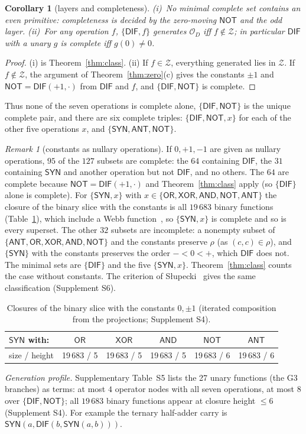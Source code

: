 \documentclass[conference]{IEEEtran}
\newcommand{\D}{D}
\newcommand{\SYN}{\mathsf{SYN}}
\newcommand{\DIF}{\mathsf{DIF}}
\newcommand{\OR}{\mathsf{OR}}
\newcommand{\XOR}{\mathsf{XOR}}
\newcommand{\AND}{\mathsf{AND}}
\newcommand{\NOT}{\mathsf{NOT}}
\newcommand{\ANT}{\mathsf{ANT}}
\newcommand{\Z}{\mathcal Z}
\newcommand{\OD}{\mathcal{O}_{\D}}
\newtheorem{corollary}{Corollary}
\theoremstyle{remark}
\newtheorem{remark}{Remark}
\begin{document}
	\begin{corollary}[layers and completeness]\label{cor:dif}
		(i)~No minimal complete set contains an even primitive: completeness is decided by the zero-moving $\NOT$ and the odd layer. (ii)~For any operation $f$, $\{\DIF,f\}$ generates $\OD$ iff $f\notin\Z$; in particular $\DIF$ with a unary $g$ is complete iff $g(0)\ne0$.
	\end{corollary}
	\begin{proof}
		(i) is Theorem~\ref{thm:class}. (ii) If $f\in\Z$, everything generated lies in $\Z$. If $f\notin\Z$, the argument of Theorem~\ref{thm:zero}(c) gives the constants $\pm1$ and $\NOT=\DIF(+1,\cdot)$ from $\DIF$ and $f$, and $\{\DIF,\NOT\}$ is complete.
	\end{proof}
	Thus none of the seven operations is complete alone, $\{\DIF,\NOT\}$ is the unique complete pair, and there are six complete triples: $\{\DIF,\NOT,x\}$ for each of the other five operations $x$, and $\{\SYN,\ANT,\NOT\}$.
	
	\begin{remark}[constants as nullary operations]\label{rem:const}
		If $0,+1,-1$ are given as nullary operations, $95$ of the $127$ subsets are complete: the $64$ containing $\DIF$, the $31$ containing $\SYN$ and another operation but not $\DIF$, and no others. The $64$ are complete because $\NOT=\DIF(+1,\cdot)$ and Theorem~\ref{thm:class} apply (so $\{\DIF\}$ alone is complete). For $\{\SYN,x\}$ with $x\in\{\OR,\XOR,\AND,\NOT,\ANT\}$ the closure of the binary slice with the constants is all $19\,683$ binary functions (Table~\ref{tab:consts}), which include a Webb function~\cite{webb1935}, so $\{\SYN,x\}$ is complete and so is every superset. The other $32$ subsets are incomplete: a nonempty subset of $\{\ANT,\OR,\XOR,\AND,\NOT\}$ and the constants preserve $\rho$ (as $(c,c)\in\rho$), and $\{\SYN\}$ with the constants preserves the order $-<0<+$, which $\DIF$ does not. The minimal sets are $\{\DIF\}$ and the five $\{\SYN,x\}$. Theorem~\ref{thm:class} counts the case without constants. The criterion of S{\l}upecki~\cite{slupecki1939,slupecki1972} gives the same classification (Supplement S6).
	\end{remark}
	\begin{table}[t]
		\centering\footnotesize
		\caption{Closures of the binary slice with the constants $0,\pm1$ (iterated composition from the projections; Supplement S4).}
		\label{tab:consts}
		\setlength{\tabcolsep}{3pt}
		\begin{tabular}{lccccc}
			\toprule
			$\SYN$ with: & $\OR$ & $\XOR$ & $\AND$ & $\NOT$ & $\ANT$\\\midrule
			size / height & 19\,683 / 5 & 19\,683 / 5 & 19\,683 / 5 & 19\,683 / 6 & 19\,683 / 6\\
			\bottomrule
		\end{tabular}
	\end{table}
	\emph{Generation profile.} Supplementary Table~S5 lists the 27 unary functions (the G3 branches) as terms: at most $4$ operator nodes with all seven operations, at most $8$ over $\{\DIF,\NOT\}$; all $19\,683$ binary functions appear at closure height $\le6$ (Supplement S4). For example the ternary half-adder carry is $\SYN(a,\DIF(b,\SYN(a,b)))$.
	
\end{document}
